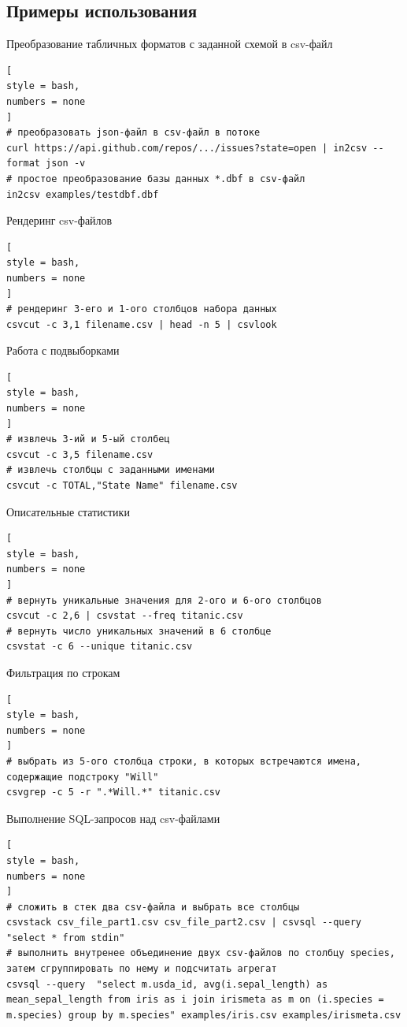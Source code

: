 \documentclass[%
	11pt,
	a4paper,
	utf8,
		]{article}
\begin{document}
\subsection{Примеры использования}

Преобразование табличных форматов с заданной схемой в csv-файл
\begin{lstlisting}[
style = bash,
numbers = none	
]
# преобразовать json-файл в csv-файл в потоке
curl https://api.github.com/repos/.../issues?state=open | in2csv --format json -v
# простое преобразование базы данных *.dbf в csv-файл
in2csv examples/testdbf.dbf
\end{lstlisting}

Рендеринг csv-файлов
\begin{lstlisting}[
style = bash,
numbers = none	
]
# рендеринг 3-его и 1-ого столбцов набора данных
csvcut -c 3,1 filename.csv | head -n 5 | csvlook
\end{lstlisting}

Работа с подвыборками
\begin{lstlisting}[
style = bash,
numbers = none
]
# извлечь 3-ий и 5-ый столбец
csvcut -c 3,5 filename.csv
# извлечь столбцы с заданными именами
csvcut -c TOTAL,"State Name" filename.csv
\end{lstlisting}

Описательные статистики
\begin{lstlisting}[
style = bash,
numbers = none
]
# вернуть уникальные значения для 2-ого и 6-ого столбцов
csvcut -c 2,6 | csvstat --freq titanic.csv
# вернуть число уникальных значений в 6 столбце
csvstat -c 6 --unique titanic.csv
\end{lstlisting}

Фильтрация по строкам
\begin{lstlisting}[
style = bash,
numbers = none	
]
# выбрать из 5-ого столбца строки, в которых встречаются имена, содержащие подстроку "Will"
csvgrep -c 5 -r ".*Will.*" titanic.csv
\end{lstlisting}

Выполнение SQL-запросов над csv-файлами
\begin{lstlisting}[
style = bash,
numbers = none
]
# сложить в стек два csv-файла и выбрать все столбцы
csvstack csv_file_part1.csv csv_file_part2.csv | csvsql --query "select * from stdin"
# выполнить внутренее объединение двух csv-файлов по столбцу species, затем сгруппировать по нему и подсчитать агрегат
csvsql --query  "select m.usda_id, avg(i.sepal_length) as mean_sepal_length from iris as i join irismeta as m on (i.species = m.species) group by m.species" examples/iris.csv examples/irismeta.csv
\end{lstlisting}
\end{document}
